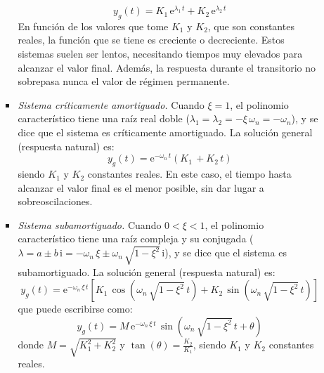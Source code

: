 \begin{enumerate}
\begin{itemize}
\begin{itemize}
\begin{equation*}
	 y_g(t)=K_1\,\mathrm{e}^{\lambda_1\,t}+K_2\,\mathrm{e}^{\lambda_2\,t}   
	\end{equation*}
	En función de los valores que tome $K_1$ y $K_2$, que son constantes reales, la función que se tiene es creciente o decreciente. Estos sistemas suelen ser lentos, necesitando tiempos muy elevados para alcanzar el valor final. Además, la respuesta durante el transitorio no sobrepasa nunca el valor de régimen permanente. 
	\item \textit{Sistema críticamente amortiguado.} Cuando $\xi=1$, el polinomio característico tiene {una raíz real doble} ($\lambda_1=\lambda_2=-\xi\,\omega_n=-\omega_n$), y se dice que el sistema es {críticamente amortiguado}. La solución general (respuesta natural) es:
	\begin{equation*}
	 y_g(t)=\mathrm{e}^{-\omega_n\,t}(K_1\,+K_2\,t)   
	\end{equation*}
	siendo $K_1$ y $K_2$ constantes reales. En este caso, el tiempo hasta alcanzar el valor final es el menor posible, sin dar lugar a sobreoscilaciones. 
	\item \textit{Sistema subamortiguado.} Cuando $0<\xi<1$, el polinomio característico tiene {una raíz compleja y su conjugada} ($\lambda=a\pm b\,\mathrm{i}=-\omega_n\,\xi\pm \omega_n\,\sqrt{1-\xi^2}\,\mathrm{i}$), y se dice que el sistema es {subamortiguado}. La solución general (respuesta natural) es:
	\begin{equation*}
	 y_g(t)=\mathrm{e}^{-\omega_n\,\xi \,t}\left[K_1\,\cos(\omega_n\,\sqrt{1-\xi^2}\,t)+K_2\,\sin(\omega_n\,\sqrt{1-\xi^2}\,t) \right]  
	\end{equation*}
	que puede escribirse como: 
	\begin{equation*}
	 y_g(t)=M\,\mathrm{e}^{-\omega_n\,\xi \,t}\,\sin\left(\omega_n\,\sqrt{1-\xi^2}\,t + \theta \right)
	\end{equation*}
	donde $M=\sqrt{K_1^2+K_2^2}$ y $\tan(\theta)=\frac{K_2}{K_1}$, siendo $K_1$ y $K_2$ constantes reales.
	\end{itemize}

\end{itemize}
\end{enumerate}
